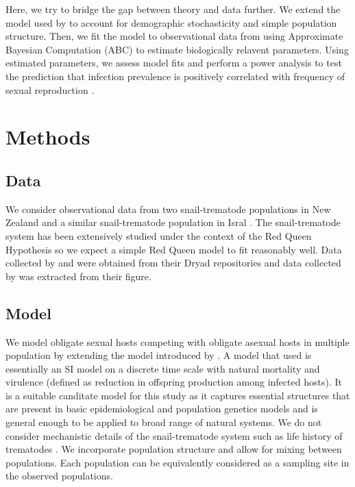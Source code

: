 \documentclass{article}\usepackage[]{graphicx}\usepackage[]{color}
\begin{document}
Here, we try to bridge the gap between theory and data further.
We extend the model used by \cite{lively2010epidemiological} to account for demographic stochasticity and simple population structure.
Then, we fit the model to observational data from \cite{dagan2013clonal, mckone2016fine, vergara2014infection} using Approximate Bayesian Computation (ABC) to estimate biologically relavent parameters.
Using estimated parameters, we assess model fits and perform a power analysis to test the prediction that infection prevalence is positively correlated with frequency of sexual reproduction \cite{lively2001trematode}.

\section{Methods}

\subsection{Data}

We consider observational data from two snail-trematode populations in New Zealand \citep{vergara2014infection, mckone2016fine} and a similar snail-trematode population in Isral \citep{dagan2013clonal}. 
The snail-trematode system has been extensively studied under the context of the Red Queen Hypothesis so we expect a simple Red Queen model to fit reasonably well.
Data collected by \cite{dagan2013clonal} and \cite{vergara2014infection} were obtained from their Dryad repositories \citep{dryad_f5t56, dryad_29nk3_2} and data collected by \cite{mckone2016fine} was extracted from their figure.

\subsection{Model}

We model obligate sexual hosts competing with obligate asexual hosts in multiple population by extending the model introduced by \cite{lively2010epidemiological}.
A model that \cite{lively2010epidemiological} used is essentially an SI model on a discrete time scale with natural mortality and virulence (defined as reduction in offspring production among infected hosts).
It is a suitable canditate model for this study as it captures essential structures that are present in basic epidemiological and population genetics models and is general enough to be applied to broad range of natural systems.
We do not consider mechanistic details of the snail-trematode system such as life history of trematodes \citep{vergara2014infection}.
We incorporate population structure and allow for mixing between populations.
Each population can be equivalently considered as a sampling site in the observed populations.
\end{document}
